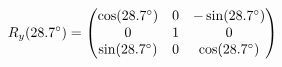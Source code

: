 \documentclass[preview]{standalone}
\begin{document}
\begin{align*}
\special{dvisvgm:raw <g id='unique000'>}R_y(28.7^\circ) = \begin{pmatrix} \cos(28.7^\circ) & 0 & -\sin(28.7^\circ) \\ 0 & 1 & 0 \\ \sin(28.7^\circ) & 0 & \cos(28.7^\circ) \end{pmatrix}\special{dvisvgm:raw </g>}
\end{align*}
\end{document}
